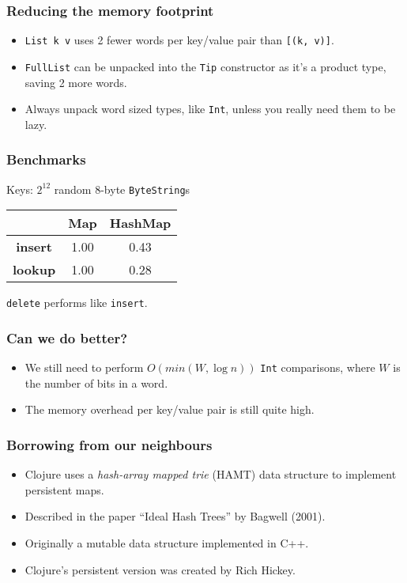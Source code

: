 \documentclass[xetex,mathserif,serif]{beamer}
\begin{document}
\begin{frame}
  \frametitle{Reducing the memory footprint}
  \begin{itemize}
  \item \lstinline!List k v! uses 2 fewer words per key/value pair
    than \lstinline![(k, v)]!.
  \item \lstinline!FullList! can be unpacked into the \lstinline!Tip!
    constructor as it's a product type, saving 2 more words.
  \item Always unpack word sized types, like \lstinline!Int!, unless
    you really need them to be lazy.
  \end{itemize}
\end{frame}

\begin{frame}
  \frametitle{Benchmarks}

  Keys: $2^{12}$ random 8-byte \lstinline!ByteString!s

  \bigskip
  \begin{tabular}{|c|c|c|}
    \hline  & \textbf{Map} & \textbf{HashMap} \\
    \hline \textbf{insert} & 1.00 & 0.43 \\
    \hline \textbf{lookup} & 1.00 & 0.28 \\
    \hline
  \end{tabular}
  \bigskip

  \lstinline!delete! performs like \lstinline!insert!.
\end{frame}

\begin{frame}
  \frametitle{Can we do better?}
  \begin{itemize}
  \item We still need to perform $O(min(W, \log n))$ \lstinline!Int!
    comparisons, where $W$ is the number of bits in a word.
  \item The memory overhead per key/value pair is still quite high.
  \end{itemize}
\end{frame}

\begin{frame}
  \frametitle{Borrowing from our neighbours}
  \begin{itemize}
  \item Clojure uses a \emph{hash-array mapped trie} (HAMT) data
    structure to implement persistent maps.
  \item Described in the paper ``Ideal Hash Trees'' by Bagwell (2001).
  \item Originally a mutable data structure implemented in C++.
  \item Clojure's persistent version was created by Rich Hickey.
  \end{itemize}
\end{frame}
\end{document}
